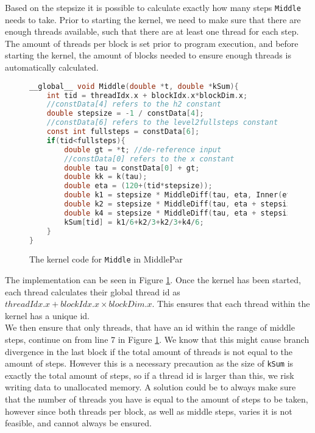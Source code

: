 Based on the stepsize it is possible to calculate exactly how many steps \texttt{Middle} needs to take. Prior to starting the kernel, we need to make sure that there are enough threads available, such that there are at least one thread for each step. The amount of threads per block is set prior to program execution, and before starting the kernel, the amount of blocks needed to ensure enough threads is automatically calculated.\\

\begin{figure}[H]
\begin{lstlisting}[language=c]
__global__ void Middle(double *t, double *kSum){
	int tid = threadIdx.x + blockIdx.x*blockDim.x;
	//constData[4] refers to the h2 constant
	double stepsize = -1 / constData[4]; 
	//constData[6] refers to the level2fullsteps constant
	const int fullsteps = constData[6]; 
	if(tid<fullsteps){
		double gt = *t; //de-reference input
		//constData[0] refers to the x constant
		double tau = constData[0] + gt; 
		double kk = k(tau);
		double eta = (120+(tid*stepsize));
		double k1 = stepsize * MiddleDiff(tau, eta, Inner(eta, gt, kk).y);
		double k2 = stepsize * MiddleDiff(tau, eta + stepsize/2, Inner(eta + stepsize/2, gt, kk).y);		
		double k4 = stepsize * MiddleDiff(tau, eta + stepsize, Inner(eta + stepsize, gt, kk).y);
		kSum[tid] = k1/6+k2/3+k2/3+k4/6;
	}
}
\end{lstlisting}
\caption{The kernel code for \texttt{Middle} in MiddlePar}
\label{fig:middlepar}
\end{figure}

The implementation can be seen in Figure \ref{fig:middlepar}. Once the kernel has been started, each thread calculates their global thread id as $threadIdx.x + blockIdx.x \times blockDim.x$. This ensures that each thread within the kernel has a unique id.\\

We then ensure that only threads, that have an id within the range of middle steps, continue on from line 7 in Figure \ref{fig:middlepar}. We know that this might cause branch divergence in the last block if the total amount of threads is not equal to the amount of steps. However this is a necessary precaution as the size of \texttt{kSum} is exactly the total amount of steps, so if a thread id is larger than this, we risk writing data to unallocated memory. A solution could be to always make sure that the number of threads you have is equal to the amount of steps to be taken, however since both threads per block, as well as middle steps, varies it is not feasible, and cannot always be ensured.\\

